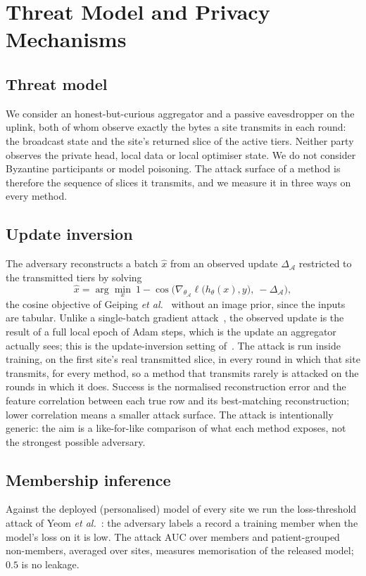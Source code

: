 \section{Threat Model and Privacy Mechanisms}
\label{sec:security}

\subsection{Threat model}
We consider an honest-but-curious aggregator and a passive eavesdropper on the uplink, both of whom observe exactly the bytes a site transmits in each round: the broadcast state and the site's returned slice of the active tiers. Neither party observes the private head, local data or local optimiser state. We do not consider Byzantine participants or model poisoning. The attack surface of a method is therefore the sequence of slices it transmits, and we measure it in three ways on every method.

\subsection{Update inversion}
The adversary reconstructs a batch $\hat x$ from an observed update $\Delta_{\mathcal A}$ restricted to the transmitted tiers by solving
\begin{equation}
\hat x=\arg\min_x\ 1-\cos\!\Big(\nabla_{\theta_{\mathcal A}}\ell\big(h_\theta(x),y\big),\ -\Delta_{\mathcal A}\Big),
\label{eq:inv}
\end{equation}
the cosine objective of Geiping \emph{et al.}~\cite{geiping2020} without an image prior, since the inputs are tabular. Unlike a single-batch gradient attack~\cite{zhu2019dlg}, the observed update is the result of a full local epoch of Adam steps, which is the update an aggregator actually sees; this is the update-inversion setting of~\cite{geiping2020}. The attack is run inside training, on the first site's real transmitted slice, in every round in which that site transmits, for every method, so a method that transmits rarely is attacked on the rounds in which it does. Success is the normalised reconstruction error and the feature correlation between each true row and its best-matching reconstruction; lower correlation means a smaller attack surface. The attack is intentionally generic: the aim is a like-for-like comparison of what each method exposes, not the strongest possible adversary.

\subsection{Membership inference}
Against the deployed (personalised) model of every site we run the loss-threshold attack of Yeom \emph{et al.}~\cite{yeom2018}: the adversary labels a record a training member when the model's loss on it is low. The attack AUC over members and patient-grouped non-members, averaged over sites, measures memorisation of the released model; $0.5$ is no leakage.

